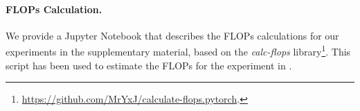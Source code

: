 \begin{table}[h]
    \centering
    \caption{Comparison of Evolve methods by number of trials, estimated total time on a single NVIDIA 4090, sample size used for Fitness computation, and final accuracy on . The number of trials is the result of $\text{population size} \times \text{iterations}$, parameters of the Genetic Algorithms of each method, and represents the total number of merged models evaluated during the entire Evolve run.}
    \label{tab:evolution_comparison}
    \vspace{10pt}
\end{table}


\paragraph{FLOPs Calculation.} We provide a Jupyter Notebook that describes the FLOPs calculations for our experiments in the supplementary material, based on the \textit{calc-flops} library\footnote{ \url{https://github.com/MrYxJ/calculate-flops.pytorch}.}. This script has been used to estimate the FLOPs for the experiment in .
